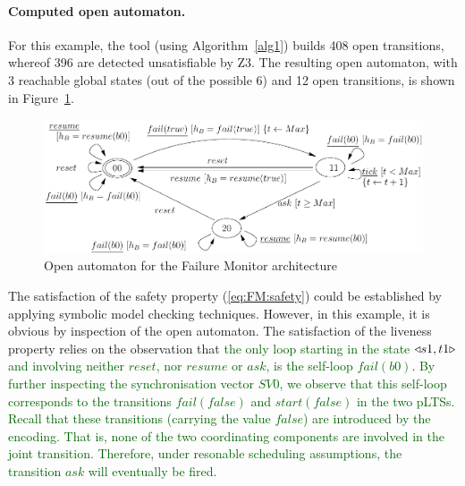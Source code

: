 \documentclass[smallcondensed]{svjour3}
\newcommand{\noteSB}[2][color=green!40, size=\tiny]{\todo[#1]{{\bf Simon: } {#2}}}
\newcommand{\OTvar}{\texttt}
\newcommand{\Simon}[1]{\textcolor{darkgreen}{#1}}
\newcommand{\ie}[1][\ ]{i.e.#1}
\begin{document}
\paragraph{Computed open automaton.}

For this example, the tool (using Algorithm~\ref{alg1}) builds 408 open transitions, whereof 396
are detected unsatisfiable by Z3.  The resulting open automaton, with
3 reachable global states (out of the possible 6) and 12 open
transitions, is shown in Figure~\ref{schema:resultOA1}.

\begin{figure}[t]
  \centerline{\includegraphics[width=12cm]{ActaXFIG/FailureTimerOA-v2-2}}
  \caption{Open automaton for the Failure Monitor architecture}
  \label{schema:resultOA1}
\end{figure}

%

The satisfaction of the safety property (\ref{eq:FM:safety}) could be
established by applying symbolic model checking techniques.  However,
in this example, it is obvious by inspection of the open automaton.
The satisfaction of the liveness property relies on the observation
that \Simon{the only loop starting in the state $\triangleleft{s1,t1}\triangleright$ and involving neither $\mathit{reset}$, nor $\mathit{resume}$ or $\mathit{ask}$, is the self-loop $\mathit{fail(b0)}$.  By further inspecting the synchronisation vector $SV0$, we observe that this self-loop corresponds to the transitions $\mathit{fail(false)}$ and $\mathit{start(false)}$ in the two pLTSs.  Recall that these transitions (carrying the value $\mathit{false}$) are introduced by the encoding. That is, none of the two coordinating components are involved in the joint transition.  Therefore, under resonable scheduling assumptions,
the transition $\mathit{ask}$ will eventually be fired.}
\end{document}
